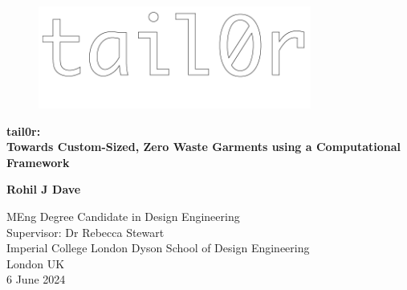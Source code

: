 \begin{titlepage}
    \begin{center}
        \vspace*{1cm}
        \begin{figure} [H]
            \centering
            \includegraphics[width=0.8\textwidth]{Images/tail0r logo.png}
        \end{figure}
        
        \Huge
        \textbf{tail0r: \\ Towards Custom-Sized, Zero Waste Garments using a Computational Framework}

 
        \vspace{1.5cm}
 
 
        \vfill
        
        
        \textbf{Rohil J Dave}
 
        \vspace{0.8cm}
 

 
        \Large
        MEng Degree Candidate in Design Engineering\\
        Supervisor: Dr Rebecca Stewart\\
        Imperial College London Dyson School of Design Engineering\\
        London UK\\
        6 June 2024
 
    \end{center}
\end{titlepage}